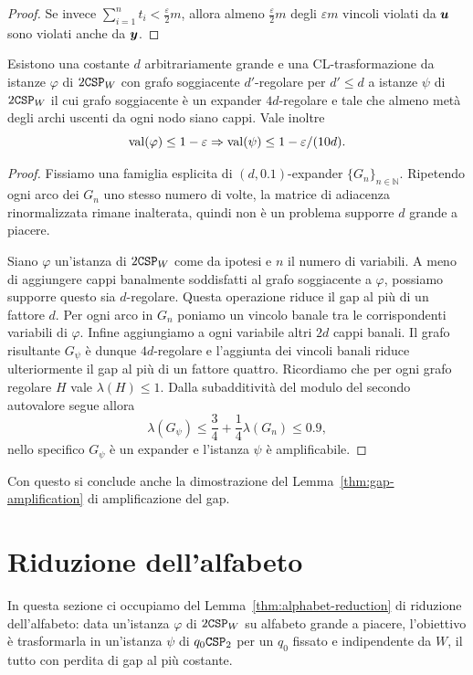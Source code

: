 \begin{proof}
	Se invece $\sum_{i=1}^n t_i < \frac{\varepsilon}{2} m$, allora almeno
	$\frac{\varepsilon}{2} m$ degli $\varepsilon m$ vincoli violati da
	$\bm{u}$ sono violati anche da $\bm{y}$.
\end{proof}

\begin{lemma}
	Esistono una costante $d$ arbitrariamente grande e una
	CL-tra\-sfor\-ma\-zio\-ne da
	istanze $\varphi$ di $2\mathtt{CSP}_W$ con grafo soggiacente $d'$-regolare per
	$d' \le d$ a istanze $\psi$ di $2\mathtt{CSP}_W$ il cui grafo soggiacente è un
	expander $4d$-regolare e tale che almeno metà degli archi uscenti da ogni
	nodo siano cappi. Vale inoltre
	\[
		\operatorname{val}(\varphi) \le 1 - \varepsilon \Rightarrow \operatorname{val}(\psi)
			\le 1 - \varepsilon / (10 d).
	\]
\end{lemma}
\begin{proof}
	Fissiamo una famiglia esplicita di $(d, 0.1)$-expander
	$\{G_n\}_{n \in \mathbb{N}}$. Ripetendo ogni arco dei $G_n$ uno stesso
	numero di volte, la matrice di adiacenza rinormalizzata rimane inalterata,
	quindi non è un problema supporre $d$ grande a piacere.

	Siano $\varphi$ un'istanza di $2\mathtt{CSP}_W$ come da ipotesi e $n$ il
	numero di variabili. A meno di aggiungere cappi banalmente soddisfatti al
	grafo soggiacente a $\varphi$, possiamo supporre questo sia $d$-regolare.
	Questa operazione riduce il gap al più di un fattore $d$.
	Per ogni arco in $G_n$ poniamo un vincolo banale tra le corrispondenti
	variabili di $\varphi$. Infine aggiungiamo a ogni variabile altri $2d$ cappi
	banali. Il grafo risultante $G_\psi$ è dunque $4d$-regolare e l'aggiunta dei
	vincoli banali riduce ulteriormente il gap al più di un fattore quattro.
	Ricordiamo che per ogni grafo regolare $H$ vale $\lambda(H) \le 1$.
	Dalla subadditività del modulo del secondo autovalore segue allora
	\[
		\lambda(G_\psi) \le \frac34 + \frac14 \lambda(G_n) \le 0.9,
	\]
	nello specifico $G_\psi$ è un expander e l'istanza $\psi$ è amplificabile.
\end{proof}
Con questo si conclude anche la dimostrazione del
Lemma~\ref{thm:gap-amplification} di amplificazione del gap.

\section{Riduzione dell'alfabeto}

In questa sezione ci occupiamo del Lemma~\ref{thm:alphabet-reduction} di
riduzione dell'alfabeto: data un'istanza $\varphi$ di $2\mathtt{CSP}_W$ su alfabeto
grande a piacere, l'obiettivo è trasformarla in un'istanza $\psi$ di $q_0\mathtt{CSP}_2$
per un $q_0$ fissato e indipendente da $W$, il tutto con perdita di gap al più
costante.

